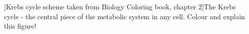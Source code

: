 {\begin{minipage}[htbp]{0.95\columnwidth}
	\vspace{2pt}
	\end{minipage}
	}{
		\vspace{1cm}
	\begin{minipage}[htbp]{0.95\columnwidth}
	   [Krebs cycle scheme taken from Biology Coloring book, chapter 2]{The Krebs cycle - the central piece of the metabolic system in any cell. Colour and explain this figure!}   \label{fig:KrebsCycleColourBook}
	\vspace{2pt}
	\end{minipage}
	}
	      
	      
	      
\clearpage
